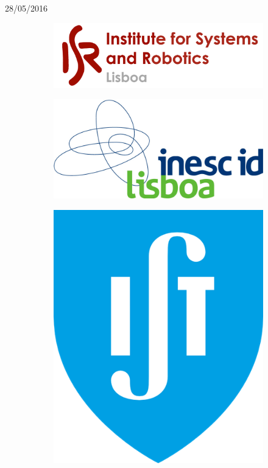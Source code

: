 \begin{titlepage}


{\large 28/05/2016}\\[1cm] %




\begin{figure}
\centering
\begin{subfigure}{.5\textwidth}
  \centering
  \includegraphics[width=.5\linewidth]{isr-logo.png}
\end{subfigure}%
\begin{subfigure}{.5\textwidth}
  \centering
  \includegraphics[width=.5\linewidth]{inesc-id-logo.png}
\end{subfigure}
\begin{subfigure}{.5\textwidth}
  \centering
  \includegraphics[width=.25\linewidth]{ist-logo.png}
\end{subfigure}
\end{figure}
 

\end{titlepage}
